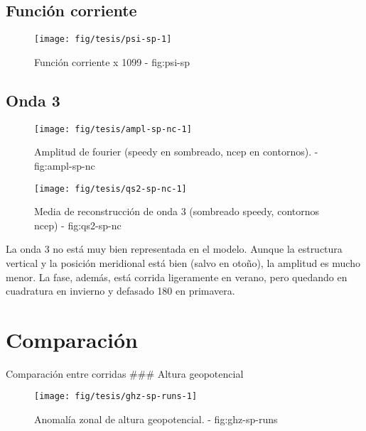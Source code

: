 \documentclass[spanish,a4paper]{book}
\begin{document}
\subsection{Función corriente}\label{funcion-corriente-2}

\begin{landscape}\begin{figure}

{\centering \texttt{[image: fig/tesis/psi-sp-1]} 

}

\caption{Función corriente x 1099 - fig:psi-sp}\label{fig:psi-sp}
\end{figure}
\end{landscape}

\subsection{Onda 3}\label{onda-3-1}

\begin{figure*}
\texttt{[image: fig/tesis/ampl-sp-nc-1]} \caption{Amplitud de fourier (speedy en sombreado, ncep en contornos). - fig:ampl-sp-nc}\label{fig:ampl-sp-nc}
\end{figure*}

\begin{figure*}
\texttt{[image: fig/tesis/qs2-sp-nc-1]} \caption{Media de reconstrucción de onda 3 (sombreado speedy, contornos ncep) - fig:qs2-sp-nc}\label{fig:qs2-sp-nc}
\end{figure*}

La onda 3 no está muy bien representada en el modelo. Aunque la
estructura vertical y la posición meridional está bien (salvo en otoño),
la amplitud es mucho menor. La fase, además, está corrida ligeramente en
verano, pero quedando en cuadratura en invierno y defasado 180 en
primavera.

\section{Comparación}\label{comparacion}

Comparación entre corridas \#\#\# Altura geopotencial

\begin{landscape}\begin{figure}

{\centering \texttt{[image: fig/tesis/ghz-sp-runs-1]} 

}

\caption{Anomalía zonal de altura geopotencial. - fig:ghz-sp-runs}\label{fig:ghz-sp-runs}
\end{figure}
\end{landscape}
\end{document}
